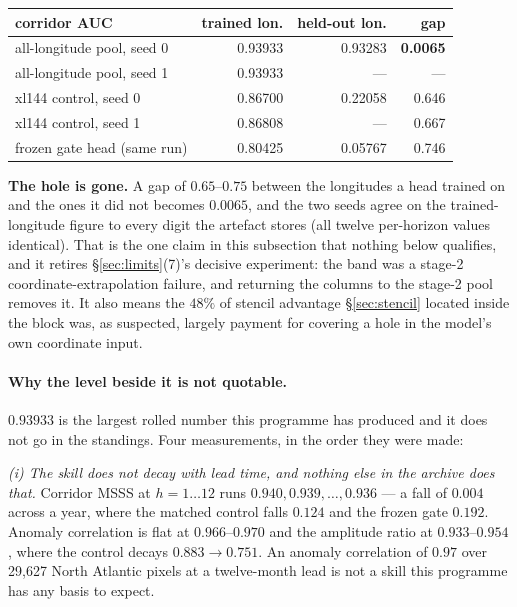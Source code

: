 \documentclass[10pt]{article}
\begin{document}
\begin{center}\small
\begin{tabular}{lrrr}
\toprule
corridor AUC & trained lon. & held-out lon. & gap \\
\midrule
all-longitude pool, seed 0 & 0.93933 & 0.93283 & \textbf{0.0065} \\
all-longitude pool, seed 1 & 0.93933 & --- & --- \\
\midrule
xl144 control, seed 0 & 0.86700 & 0.22058 & 0.646 \\
xl144 control, seed 1 & 0.86808 & --- & 0.667 \\
frozen gate head (same run) & 0.80425 & 0.05767 & 0.746 \\
\bottomrule
\end{tabular}
\end{center}

\textbf{The hole is gone.} A gap of $0.65$--$0.75$ between the longitudes a
head trained on and the ones it did not becomes $0.0065$, and the two seeds
agree on the trained-longitude figure to every digit the artefact stores
(all twelve per-horizon values identical). That is the one claim in this
subsection that nothing below qualifies, and it retires
\S\ref{sec:limits}(7)'s decisive experiment: the band was a stage-2
coordinate-extrapolation failure, and returning the columns to the stage-2
pool removes it. It also means the $48\%$ of stencil advantage
\S\ref{sec:stencil} located inside the block was, as suspected, largely
payment for covering a hole in the model's own coordinate input.

\paragraph{Why the level beside it is not quotable.} $0.93933$ is the
largest rolled number this programme has produced and it does not go in the
standings. Four measurements, in the order they were made:

\emph{(i) The skill does not decay with lead time, and nothing else in the
archive does that.} Corridor MSSS at $h=1\ldots12$ runs
$0.940, 0.939, \ldots, 0.936$ --- a fall of $0.004$ across a year, where the
matched control falls $0.124$ and the frozen gate $0.192$. Anomaly
correlation is flat at $0.966$--$0.970$ and the amplitude ratio at
$0.933$--$0.954$, where the control decays $0.883\to0.751$. An anomaly
correlation of $0.97$ over 29{,}627 North Atlantic pixels at a twelve-month
lead is not a skill this programme has any basis to expect.
\end{document}
